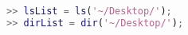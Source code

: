 \begin{lstlisting}[language=matlab]
>> lsList = ls('~/Desktop/');
>> dirList = dir('~/Desktop/');

\end{lstlisting}